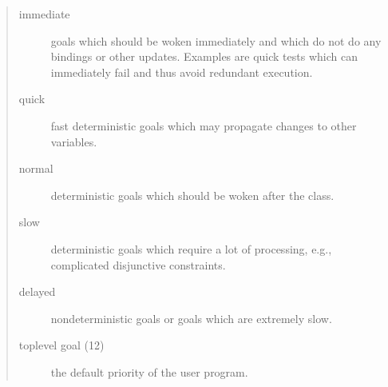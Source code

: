 {\begin{quote}
\begin{description}
\item [immediate]  goals which should be woken immediately
and which do not do any bindings or other updates.
Examples are quick tests which can immediately fail and
thus avoid redundant execution.

\item [quick]  fast deterministic goals which may
propagate changes to other variables.

\item [normal]  deterministic goals which should be woken
after the  class.

\item [slow]  deterministic goals which require
a lot of processing, e.g., complicated disjunctive
constraints.

\item [delayed]  nondeterministic goals
or goals which are extremely slow.

\item [toplevel goal (12)]  the default priority of the user program.
\end{description}
\end{quote}




}
